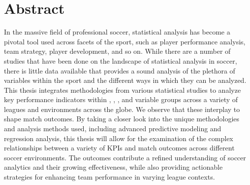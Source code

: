 \chapter{Abstract}

In the massive field of professional soccer, statistical analysis has become a pivotal tool used across facets of the sport, such as player performance analysis, team strategy, player development, and so on. While there are a number of studies that have been done on the landscape of statistical analysis in soccer, there is little data available that provides a sound analysis of the plethora of variables within the sport and the different ways in which they can be analyzed. This thesis integrates methodologies from various statistical studies to analyze key performance indicators within , , , and  variable groups across a variety of leagues and environments across the globe. We observe that these 
interplay to shape match outcomes. By taking a closer look into the unique methodologies and analysis methods used, including advanced predictive modeling and regression analysis, this thesis will allow for the examination of the complex relationships between a variety of KPIs and match outcomes across different soccer environments. The outcomes contribute a refined understanding of soccer analytics and their growing effectiveness, while also providing actionable strategies for enhancing team performance in varying league contexts.

